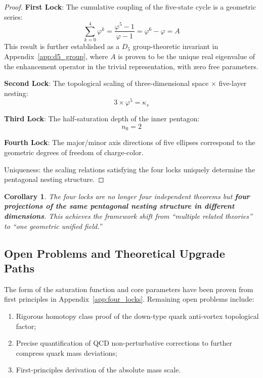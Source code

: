 \documentclass[12pt,a4paper,twocolumn]{article}
\renewcommand{\phi}{\varphi}
\newtheorem{corollary}[theorem]{Corollary}
\begin{document}
\begin{proof}
\textbf{First Lock}: The cumulative coupling of the five-state cycle is a geometric series:
$$\sum_{k=0}^{4}\phi^k = \frac{\phi^5-1}{\phi-1} = \phi^6 - \phi = A$$
This result is further established as a $D_5$ group-theoretic invariant in Appendix~\ref{app:d5_group}, where $A$ is proven to be the unique real eigenvalue of the enhancement operator in the trivial representation, with zero free parameters.

\textbf{Second Lock}: The topological scaling of three-dimensional space $\times$ five-layer nesting:
$$3 \times \phi^5 = \kappa_s$$

\textbf{Third Lock}: The half-saturation depth of the inner pentagon:
$$n_0 = 2$$

\textbf{Fourth Lock}: The major/minor axis directions of five ellipses correspond to the geometric degrees of freedom of charge-color.

Uniqueness: the scaling relations satisfying the four locks uniquely determine the pentagonal nesting structure.
\end{proof}

\begin{corollary}
The four locks are no longer four independent theorems but \textbf{four projections of the same pentagonal nesting structure in different dimensions}. This achieves the framework shift from ``multiple related theories'' to ``one geometric unified field.''
\end{corollary}

\subsection{Open Problems and Theoretical Upgrade Paths}
The form of the saturation function and core parameters have been proven from first principles in Appendix~\ref{app:four_locks}. Remaining open problems include:
\begin{enumerate}
\item Rigorous homotopy class proof of the down-type quark anti-vortex topological factor;
\item Precise quantification of QCD non-perturbative corrections to further compress quark mass deviations;
\item First-principles derivation of the absolute mass scale.
\end{enumerate}
\end{document}
